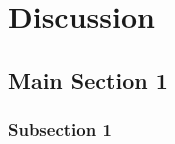 


\chapter{Discussion} %

\label{Chapter5} %


\section{Main Section 1}


\subsection{Subsection 1}


